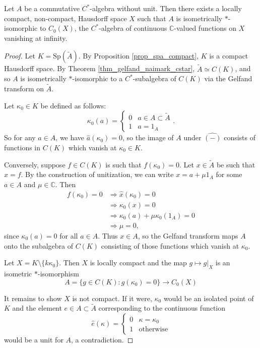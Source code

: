 \documentclass[12pt]{article}
\begin{document}
\begin{theorem}
	Let $A$ be a commutative $C^\ast$-algebra without unit. Then there exists a locally compact, non-compact, Hausdorff space $X$ such that $A$ is isometrically $\ast$-isomorphic to $C_0(X)$, the $C^\ast$-algebra of continuous $\mathbb{C}$-valued functions on $X$ vanishing at infinity.
\end{theorem}
\begin{proof}
	Let $K=\text{Sp}(\tilde{A})$. By Proposition \ref{prop_spa_compact}, $K$ is a compact Hausdorff space. By Theorem \ref{thm_gelfand_naimark_cstar}, $\tilde{A}\simeq C(K)$, and so $A$ is isometrically $\ast$-isomorphic to a $C^\ast$-subalgebra of $C(K)$ via the Gelfand transform on $\tilde{A}$. 

	Let $\kappa_0\in K$ be defined as follows: 
	\begin{equation*}
		\kappa_0(a) = 
		\begin{cases}
			0 & a\in A\subset\tilde{A} \\
			1 & a = 1_A
		\end{cases}.
	\end{equation*}
	 So for any $a\in A$, we have $\hat{a}(\kappa_0)=0$, so the image of $A$ under $\widehat{(-)}$ consists of functions in $C(K)$ which vanish at $\kappa_0\in K$. 

	Conversely, suppose $f\in C(K)$ is such that $f(\kappa_0)=0$. Let $x\in\tilde{A}$ be such that $\hat{x}=f$. By the construction of unitization, we can write $x=a+\mu 1_A$ for some $a\in A$ and $\mu\in\mathbb{C}$. Then 
	\begin{align*}
		f(\kappa_0) = 0 &\Rightarrow \hat{x}(\kappa_0) = 0 \\
						&\Rightarrow \kappa_0(x) = 0 \\
						&\Rightarrow \kappa_0(a) + \mu\kappa_0(1_A)=0 \\
						&\Rightarrow \mu=0,
	\end{align*}
	since $\kappa_0(a)=0$ for all $a\in A$. Thus $x\in A$, so the Gelfand transform maps $A$ onto the subalgebra of $C(K)$ consisting of those functions which vanish at $\kappa_0$. 

	Let $X=K\setminus\{k\kappa_0\}$. Then $X$ is locally compact  and the map $g\mapsto g|_X$ is an isometric $\ast$-isomorphism 
	\begin{equation*}
		A=\{g\in C(K) : g(\kappa_0)=0\} \longrightarrow C_0(X)
	\end{equation*}

	It remains to show $X$ is not compact. If it were, $\kappa_0$ would be an isolated point of $K$  and the element $e\in A\subset\tilde{A}$ corresponding to the continuous function 
	\begin{equation*}
		\hat{e}(\kappa) = 
		\begin{cases}
			0 & \kappa=\kappa_0 \\
			1 & \text{otherwise}
		\end{cases}
	\end{equation*}
	would be a unit for $A$, a contradiction.
\end{proof}
\end{document}
